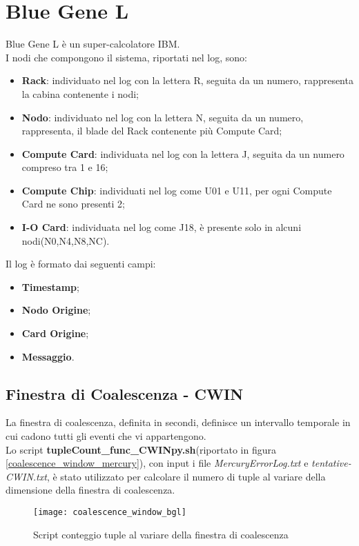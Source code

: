 \section{Blue Gene L}
Blue Gene L è un super-calcolatore IBM.\\
I nodi che compongono il sistema, riportati nel log, sono:
\begin{itemize}
  \item \textbf{Rack}: individuato nel log con la lettera R, seguita da un numero,
  rappresenta la cabina contenente i nodi;
  \item \textbf{Nodo}: individuato nel log con la lettera N, seguita da un numero,
  rappresenta, il blade del Rack contenente più Compute Card;
  \item \textbf{Compute Card}: individuata nel log con la lettera J, seguita da un
  numero compreso tra 1 e 16;
  \item \textbf{Compute Chip}: individuati nel log come U01 e U11, per ogni Compute
  Card ne sono presenti 2;
  \item \textbf{I-O Card}: individuata nel log come J18, è presente solo in alcuni
  nodi(N0,N4,N8,NC).
\end{itemize}

Il log è formato dai seguenti campi:
\begin{itemize}
  \item \textbf{Timestamp};
  \item \textbf{Nodo Origine};
  \item \textbf{Card Origine};
  \item \textbf{Messaggio}.
\end{itemize}

\clearpage

\subsection{Finestra di Coalescenza - CWIN}
La finestra di coalescenza, definita in secondi, definisce un intervallo temporale
in cui cadono tutti gli eventi che vi appartengono.\\
Lo script \textbf{tupleCount\_func\_CWINpy.sh}(riportato in figura \ref{coalescence_window_mercury}), con input i file \textit{MercuryErrorLog.txt}
e \textit{tentative-CWIN.txt}, è stato utilizzato per calcolare il numero di tuple al
variare della dimensione della finestra di coalescenza.\\

\begin{figure}[!htbp]
  \centering
  \texttt{[image: coalescence\_window\_bgl]}
  \caption{Script conteggio tuple al variare della finestra di coalescenza}
  \label{coalescence_window_bgl}
\end{figure}

